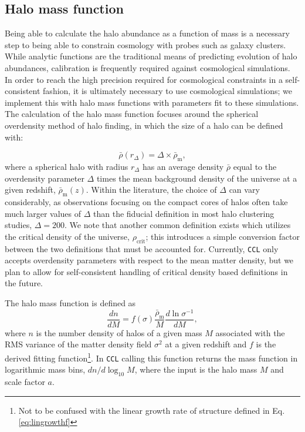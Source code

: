 \documentclass[\docopts]{\docclass}
\newcommand{\ccl}{{\tt CCL}\xspace}
\begin{document}
\subsection{Halo mass function}

Being able to calculate the halo abundance as a function of mass is a necessary step to being able to constrain cosmology with probes such as galaxy clusters. While analytic functions are the traditional means of predicting evolution of halo abundances, calibration is frequently required against cosmological simulations. In order to reach the high precision required for cosmological constraints in a self-consistent fashion, it is ultimately necessary to use cosmological simulations; we implement this with halo mass functions with parameters fit to these simulations. The calculation of the halo mass function focuses around the spherical overdensity method of halo finding, in which the size of a halo can be defined with:

\begin{equation}
\bar{\rho}(r_{\Delta}) = \Delta \times \bar{\rho}_{\mathrm{m}},
\end{equation}
%
where a spherical halo with radius $r_{\Delta}$ has an average density $\bar{\rho}$ equal to the overdensity parameter $\Delta$ times the mean background density of the universe at a given redshift, $\bar\rho_{\mathrm{m}}(z)$. Within the literature, the choice of $\Delta$ can vary considerably, as observations focusing on the compact cores of halos often take much larger values of $\Delta$ than the fiducial definition in most halo clustering studies, $\Delta = 200$. We note that another common definition exists which utilizes the critical density of the universe, $\rho_{\mathrm{crit}}$; this introduces a simple conversion factor between the two definitions that must be accounted for. Currently, \ccl only accepts overdensity parameters with respect to the mean matter density, but we plan to allow for self-consistent handling of critical density based definitions in the future.

The halo mass function is defined as
\begin{equation}
\frac{dn}{dM}=f(\sigma)\frac{\bar{\rho}_\mathrm{m}}{M}\frac{d\ln{\sigma^{-1}}}{dM},
\label{eq:halo_mass_function}
\end{equation}
where $n$ is the number density of halos of a given mass $M$ associated with the RMS variance of the matter density field $\sigma^2$ at a given redshift and $f$ is the derived fitting function\footnote{Not to be confused with the linear growth rate of structure defined in Eq. \ref{eq:lingrowthf}}. In \ccl calling this function returns the mass function in logarithmic mass bins, $dn/d\log_{10}{M}$, where the input is the halo mass $M$ and scale factor $a$.
\end{document}

